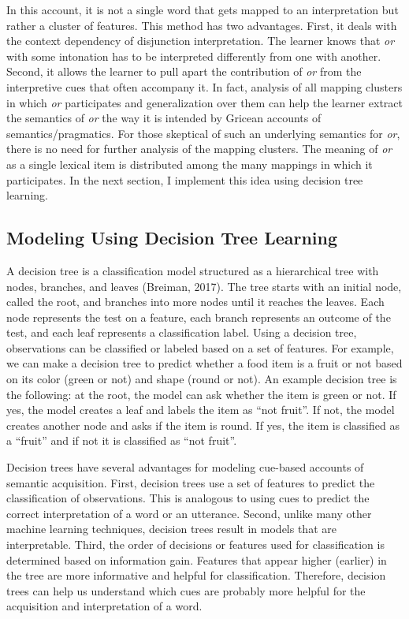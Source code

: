 \documentclass[floatsintext,man]{apa6}
\theoremstyle{definition}
\theoremstyle{definition}
\theoremstyle{definition}
\theoremstyle{remark}
\begin{document}
In this account, it is not a single word that gets mapped to an
interpretation but rather a cluster of features. This method has two
advantages. First, it deals with the context dependency of disjunction
interpretation. The learner knows that \emph{or} with some intonation
has to be interpreted differently from one with another. Second, it
allows the learner to pull apart the contribution of \emph{or} from the
interpretive cues that often accompany it. In fact, analysis of all
mapping clusters in which \emph{or} participates and generalization over
them can help the learner extract the semantics of \emph{or} the way it
is intended by Gricean accounts of semantics/pragmatics. For those
skeptical of such an underlying semantics for \emph{or}, there is no
need for further analysis of the mapping clusters. The meaning of
\emph{or} as a single lexical item is distributed among the many
mappings in which it participates. In the next section, I implement this
idea using decision tree learning.

\subsection{Modeling Using Decision Tree Learning}\label{DecisionTrees}

A decision tree is a classification model structured as a hierarchical
tree with nodes, branches, and leaves (Breiman, 2017). The tree starts
with an initial node, called the root, and branches into more nodes
until it reaches the leaves. Each node represents the test on a feature,
each branch represents an outcome of the test, and each leaf represents
a classification label. Using a decision tree, observations can be
classified or labeled based on a set of features. For example, we can
make a decision tree to predict whether a food item is a fruit or not
based on its color (green or not) and shape (round or not). An example
decision tree is the following: at the root, the model can ask whether
the item is green or not. If yes, the model creates a leaf and labels
the item as \enquote{not fruit}. If not, the model creates another node
and asks if the item is round. If yes, the item is classified as a
\enquote{fruit} and if not it is classified as \enquote{not fruit}.

Decision trees have several advantages for modeling cue-based accounts
of semantic acquisition. First, decision trees use a set of features to
predict the classification of observations. This is analogous to using
cues to predict the correct interpretation of a word or an utterance.
Second, unlike many other machine learning techniques, decision trees
result in models that are interpretable. Third, the order of decisions
or features used for classification is determined based on information
gain. Features that appear higher (earlier) in the tree are more
informative and helpful for classification. Therefore, decision trees
can help us understand which cues are probably more helpful for the
acquisition and interpretation of a word.
\end{document}
